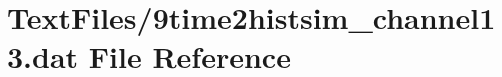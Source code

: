 \hypertarget{9time2histsim__channel13_8dat}{}\section{Text\+Files/9time2histsim\+\_\+channel13.dat File Reference}
\label{9time2histsim__channel13_8dat}
